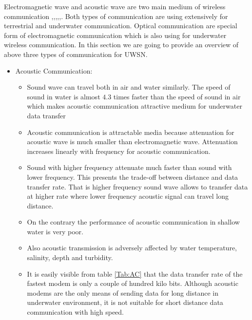 \documentclass[12pt]{article}
\begin{document}
Electromagnetic wave and acoustic wave are two main medium of wireless communication \cite{li2014channel}\cite{shah2009survey},\cite{yunus2010survey},\cite{han2013m},\cite{climent2014underwater},\cite{6757189},\cite{otnes2012underwater}\cite{partan2007survey}. Both types of communication are using  extensively for terrestrial and underwater communication. Optical communication  are special form of electromagnetic communication which is also using for underwater wireless communication. In this section we are going to provide an overview of above three types of communication for UWSN.
\begin{itemize}
\item{Acoustic Communication:}
\begin{itemize}
\item  Sound wave can travel both in air and water similarly. The speed of sound in water is almost $4.3$ times faster than the speed of sound in air which makes acoustic communication attractive medium for underwater data transfer\cite{stojanovic2009underwater}\cite{stojanovic2008underwater}
\cite{proakis2001shallow}
 
\item Acoustic communication is attractable media because attenuation for acoustic wave is much smaller than electromagnetic wave. Attenuation increases linearly with frequency for acoustic communication\cite{uribe2009radio}. 
\item Sound with higher frequency attenuate much faster than sound with lower frequency. This presents the trade-off between distance and data transfer rate. That is higher frequency sound wave allows to transfer data at higher rate where lower frequency acoustic signal can travel long distance.
\item On the contrary the performance of acoustic communication in shallow water is very poor.
\item Also acoustic transmission is adversely affected by water temperature, salinity, depth and turbidity\cite{che2010re}.
\item It is easily visible from table \ref{Tab:AC} that the data transfer rate of the fastest modem is only a couple of hundred kilo bits. Although acoustic modems are the only means of sending data for long distance in underwater environment, it is not suitable for  short distance data communication with high speed.
\end{itemize}
  \begin{table}


\end{table}
\end{itemize}
\end{document}
